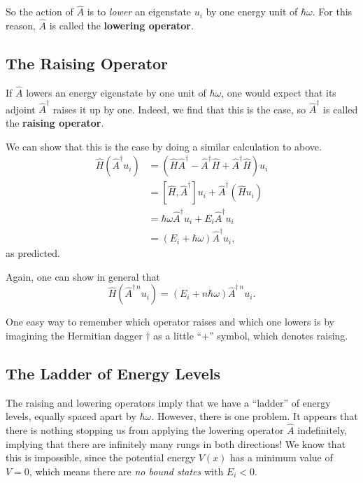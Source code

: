 \documentclass[../quantum_mechanics.tex]{subfiles}
\begin{document}
            So the action of $\hat{A}$ is to \textit{lower} an eigenstate $u_i$ by one energy unit of $\hbar\omega$.
            For this reason, $\hat{A}$ is called the \textbf{lowering operator}.

        \subsection{The Raising Operator}\label{subsec:the-raising-operator}
            If $\hat{A}$ lowers an energy eigenstate by one unit of $\hbar\omega$, one would expect that its adjoint $\hat{A}^\dagger$ raises it up by one.
            Indeed, we find that this is the case, so $\hat{A}^\dagger$ is called the \textbf{raising operator}.

            We can show that this is the case by doing a similar calculation to above.
            \begin{align}
                \hat{H}(\hat{A}^\dagger u_i)&=(\hat{H}\hat{A}^\dagger-\hat{A}^\dagger\hat{H}+\hat{A}^\dagger\hat{H})u_i\\
                &=[\hat{H},\hat{A}^\dagger]u_i+\hat{A}^\dagger(\hat{H}u_i)\\
                &=\hbar\omega\hat{A}^\dagger u_i+E_i\hat{A}^\dagger u_i\\
                &=(E_i+\hbar\omega)\hat{A}^\dagger u_i,\label{eq:qho-ladder-raising-action}
            \end{align}
            as predicted.

            Again, one can show in general that
            \begin{equation}
                \hat{H}(\hat{A}^{\dagger\,n}u_i)=(E_i+n\hbar\omega)\hat{A}^{\dagger\,n}u_i.
            \end{equation}

            One easy way to remember which operator raises and which one lowers is by imagining the Hermitian dagger $\dagger$ as a little ``+'' symbol, which denotes raising.

        \subsection{The Ladder of Energy Levels}\label{subsec:the-ladder-of-energy-levels}
            The raising and lowering operators imply that we have a ``ladder'' of energy levels, equally spaced apart by $\hbar\omega$.
            However, there is one problem.
            It appears that there is nothing stopping us from applying the lowering operator $\hat{A}$ indefinitely, implying that there are infinitely many rungs in both directions!
            We know that this is impossible, since the potential energy $V(x)$ has a minimum value of $V=0$, which means there are \textit{no bound states} with $E_i<0$.
\end{document}

